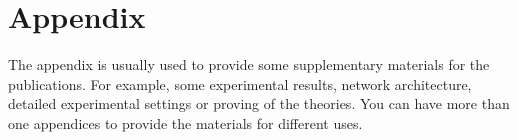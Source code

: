 
\chapter{Appendix} %
\label{AppendixA} %
The appendix is usually used to provide some supplementary materials for the publications. For example, some experimental results, network architecture, detailed experimental settings or proving of the theories. You can have more than one appendices to provide the materials for different uses.

